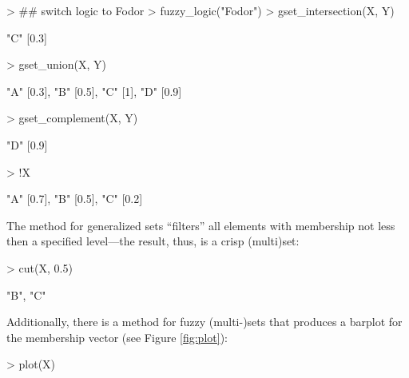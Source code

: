 \documentclass[article]{jss}
\newcommand{\codefun}[1]{\code{#1()}}
\newcommand{\dQuote}[1]{``{#1}''}
\begin{document}
\begin{Schunk}
\begin{Sinput}
> ## switch logic to Fodor
> fuzzy_logic("Fodor")
> gset_intersection(X, Y)
\end{Sinput}
\begin{Soutput}
{"C" [0.3]}
\end{Soutput}
\begin{Sinput}
> gset_union(X, Y)
\end{Sinput}
\begin{Soutput}
{"A" [0.3], "B" [0.5], "C" [1], "D" [0.9]}
\end{Soutput}
\begin{Sinput}
> gset_complement(X, Y)
\end{Sinput}
\begin{Soutput}
{"D" [0.9]}
\end{Soutput}
\begin{Sinput}
> !X
\end{Sinput}
\begin{Soutput}
{"A" [0.7], "B" [0.5], "C" [0.2]}
\end{Soutput}
\end{Schunk}
The \codefun{cut} method for generalized sets
\dQuote{filters} all elements with membership
not less then a specified level---the result, thus, is a crisp (multi)set:
\begin{Schunk}
\begin{Sinput}
> cut(X, 0.5)
\end{Sinput}
\begin{Soutput}
{"B", "C"}
\end{Soutput}
\end{Schunk}
Additionally, there is a \codefun{plot} method for fuzzy (multi-)sets
that produces a barplot for the membership vector (see Figure \ref{fig:plot}):
\begin{Schunk}
\begin{Sinput}
> plot(X)
\end{Sinput}
\end{Schunk}
\end{document}
